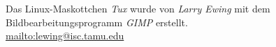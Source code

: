 %
Das Linux-Maskottchen \textit{Tux} wurde von \textit{Larry Ewing} mit 
dem Bildbearbeitungsprogramm \textit{GIMP} erstellt.\\
\url{mailto:lewing@isc.tamu.edu}
